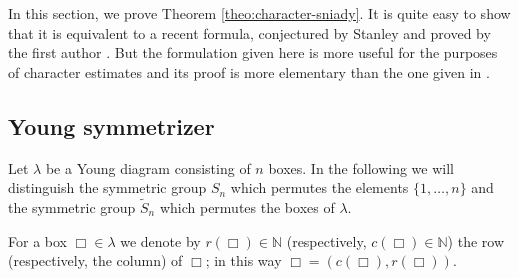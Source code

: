 \documentclass[12pt]{amsart}
\theoremstyle{plain}
\theoremstyle{remark}
\newcommand{\N}{\mathbb{N}}
\newcommand{\Sy}{\tilde{S}}
\begin{document}
% 

In this section, we prove Theorem \ref{theo:character-sniady}. It is quite easy
to show that it is equivalent to a recent formula, conjectured by Stanley
\cite{Stanley-preprint} and proved by the first author \cite{F'eray-preprint}.
But the formulation given here is more useful for the purposes of character
estimates and its proof is more elementary than the one given in
\cite{F'eray-preprint}.

\subsection{Young symmetrizer}
Let $\lambda$ be a Young diagram consisting of $n$ boxes.
In the following we will distinguish the symmetric group $S_n$ which permutes the 
elements $\{1,\dots,n\}$ and the symmetric group $\Sy_n$ which permutes the boxes of $\lambda$.


For a box $\Box\in\lambda$ we denote by $r(\Box)\in\N$ (respectively, $c(\Box)\in\N$) the row
(respectively, the column) of $\Box$; in this way
$\Box=(c(\Box),r(\Box))$.
\end{document}
